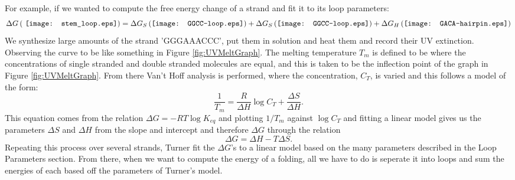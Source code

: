 For example, if we wanted to compute the free energy change of a
strand and fit it to its loop parameters:
\begin{equation}
\Delta G \left ( \vcenter{\hbox{ \texttt{[image: stem\_loop.eps]}}}
 \right ) =
\Delta G_S \left ( \vcenter{\hbox{\texttt{[image: GGCC-loop.eps]}}}
\right ) +
\Delta G_S \left ( \vcenter{\hbox{\texttt{[image: GGCC-loop.eps]}}}
\right ) + 
\Delta G_H \left (\vcenter{\hbox{\texttt{[image: GACA-hairpin.eps]}}}
\right ) 
\end{equation}
We synthesize large amounts of the strand 'GGGAAACCC', put them in
solution and heat them and record their UV extinction. Observing the
curve to be like something in Figure \ref{fig:UVMeltGraph}. The
melting temperature $T_m$ is defined to be where the concentrations of
single stranded and double stranded molecules are equal, and this is
taken to be the inflection point of the graph in Figure
\ref{fig:UVMeltGraph}. From there Van't Hoff analysis is performed,
where the concentration, $C_T$, is varied and this follows a model of
the form:
\begin{equation}
  \frac{1}{T_m} = \frac{R}{\Delta H} \log{C_T} + \frac{\Delta S}{\Delta H}.
\end{equation}
This equation comes from the relation $\Delta G = -RT \log{K_{eq}}$
and plotting $1/T_m$ against $\log{C_T}$ and fitting a linear model
gives us the parameters $\Delta S$ and $\Delta H$ from the slope and
intercept and therefore $\Delta G$ through the relation
\begin{equation}
\Delta G = \Delta H - T \Delta S.
\end{equation}
Repeating this process over several strands, Turner fit the $\Delta
G$'s to a linear model based on the many parameters described in the
Loop Parameters section. From there, when we want to compute the
energy of a folding, all we have to do is seperate it into loops and
sum the energies of each based off the parameters of Turner's model.


%
%

